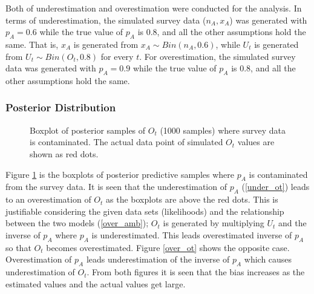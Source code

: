 \documentclass[]{article}
\begin{document}
Both of underestimation and overestimation were conducted for the analysis. In terms of underestimation, the simulated survey data ($n_A, x_A$) was generated with $p_A=0.6$ while the true value of $p_A$ is 0.8, and all the other assumptions hold the same. That is, $x_A$ is generated from $x_A \sim Bin(n_A, 0.6)$, while $U_t$ is generated from $U_t \sim Bin(O_t, 0.8)$ for every $t$. For overestimation, the simulated survey data was generated with $p_A=0.9$ while the true value of $p_A$ is 0.8, and all the other assumptions hold the same.  \\

\subsubsection{Posterior Distribution}

\begin{figure}[htb]
	\centering
	\caption[two early result box plots:]{Boxplot of posterior samples of $O_t$ (1000 samples) where survey data is contaminated.  The actual data point of simulated $O_t$ values are shown as red dots.}
	\label{contam_ot}
\end{figure}

\normalsize 
Figure \ref{contam_ot} is the boxplots of posterior predictive samples where $p_A$ is contaminated from the survey data. It is seen that the underestimation of $p_A$ (\ref{under_ot}) leads to an overestimation of $O_t$ as the boxplots are above the red dots. This is justifiable considering the given data sets (likelihoods) and the relationship between the two models (\ref{over_amb}); $O_t$ is generated by multiplying $U_t$ and the inverse of $p_A$ where $p_A$ is underestimated. This leads overestimated inverse of $p_A$ so that  $O_t$ becomes overestimated. Figure \ref{over_ot} shows the opposite case. Overestimation of $p_A$ leads underestimation of the inverse of $p_A$ which causes underestimation of $O_t$. From both figures it is seen that the bias increases as the estimated values and the actual values get large.\\
\end{document}
